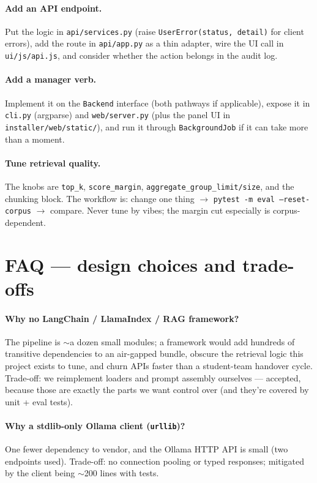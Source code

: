 \documentclass[11pt,letterpaper]{article}
\let\oldsection\section
\renewcommand{\section}{\vspace{1em}\oldsection}
\begin{document}
\paragraph{Add an API endpoint.}
Put the logic in \texttt{api/services.py} (raise \texttt{UserError(status,
detail)} for client errors), add the route in \texttt{api/app.py} as a thin
adapter, wire the UI call in \texttt{ui/js/api.js}, and consider whether
the action belongs in the audit log.

\paragraph{Add a manager verb.}
Implement it on the \texttt{Backend} interface (both pathways if
applicable), expose it in \texttt{cli.py} (argparse) and
\texttt{web/server.py} (plus the panel UI in
\texttt{installer/web/static/}), and run it through
\texttt{BackgroundJob} if it can take more than a moment.

\paragraph{Tune retrieval quality.}
The knobs are \texttt{top\_k}, \texttt{score\_margin},
\texttt{aggregate\_group\_limit/size}, and the chunking block. The workflow
is: change one thing $\rightarrow$ \texttt{pytest -m eval --reset-corpus}
$\rightarrow$ compare. Never tune by vibes; the margin cut especially is
corpus-dependent.

\section{FAQ --- design choices and trade-offs}

\paragraph{Why no LangChain / LlamaIndex / RAG framework?}
The pipeline is $\sim$a dozen small modules; a framework would add hundreds
of transitive dependencies to an air-gapped bundle, obscure the retrieval
logic this project exists to tune, and churn APIs faster than a
student-team handover cycle. Trade-off: we reimplement loaders and prompt
assembly ourselves --- accepted, because those are exactly the parts we
want control over (and they're covered by unit + eval tests).

\paragraph{Why a stdlib-only Ollama client (\texttt{urllib})?}
One fewer dependency to vendor, and the Ollama HTTP API is small (two
endpoints used). Trade-off: no connection pooling or typed responses;
mitigated by the client being $\sim$200 lines with tests.
\end{document}
